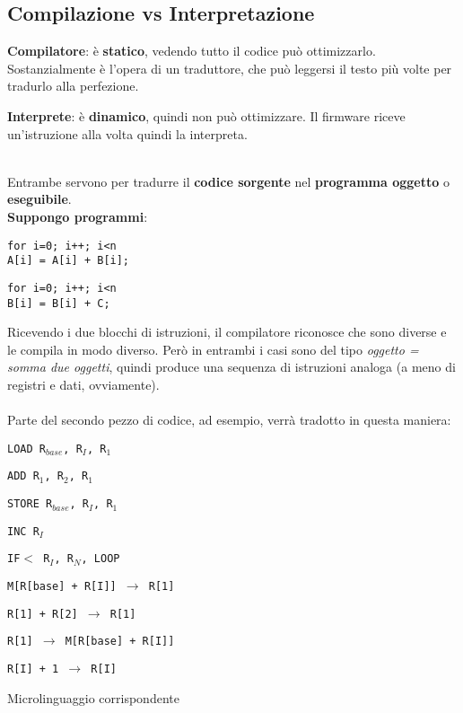 \documentclass[10pt]{article}
\begin{document}
\subsection{Compilazione vs Interpretazione}
\begin{multicols}{2}
\textbf{Compilatore}: è \textbf{statico}, vedendo tutto il codice può ottimizzarlo. Sostanzialmente è l'opera di un traduttore, che può leggersi il testo più volte per tradurlo alla perfezione.\\
\columnbreak

\textbf{Interprete}: è \textbf{dinamico}, quindi non può ottimizzare. Il firmware riceve un'istruzione alla volta quindi la interpreta.\\\\
\end{multicols}
Entrambe servono per tradurre il \textbf{codice sorgente} nel \textbf{programma oggetto} o \textbf{eseguibile}.\\

\textbf{Suppongo programmi}:\\
\begin{multicols}{2}
\texttt{for i=0; i++; i<n\\    A[i] = A[i] + B[i];}

\columnbreak
\texttt{for i=0; i++; i<n\\    B[i] = B[i] + C;}
\end{multicols}
Ricevendo i due blocchi di istruzioni, il compilatore riconosce che sono diverse e le compila in modo diverso. Però in entrambi i casi sono del tipo \textit{oggetto = somma due oggetti}, quindi produce una sequenza di istruzioni analoga (a meno di registri e dati, ovviamente).\\\\
Parte del secondo pezzo di codice, ad esempio, verrà tradotto in questa maniera:
\begin{multicols}{2}
\begin{list}{}{}
\item \texttt{LOAD R$_{base}$, R$_{I}$, R$_{1}$}
\item \texttt{ADD R$_{1}$, R$_{2}$, R$_{1}$}
\item \texttt{STORE R$_{base}$, R$_{I}$, R$_{1}$}
\item \texttt{INC R$_{I}$}
\item \texttt{IF$<$ R$_{I}$, R$_{N}$, LOOP}
\end{list}
\columnbreak
\begin{list}{}{}
\item \texttt{M[R[base] + R[I]] $\rightarrow$ R[1]}
\item \texttt{R[1] + R[2] $\rightarrow$ R[1]}
\item \texttt{R[1]  $\rightarrow$ M[R[base] + R[I]]}
\item \texttt{R[I] + 1 $\rightarrow$ R[I]}
\end{list}
Microlinguaggio corrispondente
\end{multicols}
\pagebreak
\end{document}
